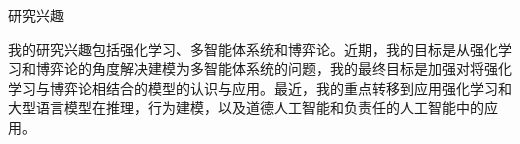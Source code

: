 \documentclass{resume} %
\begin{document}
\begin{rSection}{研究兴趣}

我的研究兴趣包括强化学习、多智能体系统和博弈论。近期，我的目标是从强化学习和博弈论的角度解决建模为多智能体系统的问题，我的最终目标是加强对将强化学习与博弈论相结合的模型的认识与应用。​最近，我的重点转移到应用强化学习和大型语言模型在推理，行为建模，以及道德人工智能和负责任的人工智能中的应用。

\end{rSection}
\end{document}
